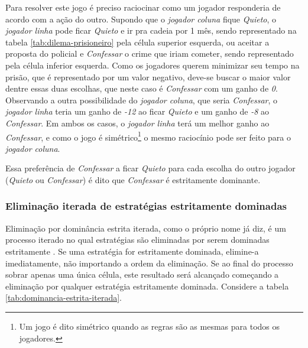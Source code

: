 Para resolver este jogo é preciso raciocinar como um jogador responderia de acordo com a ação do outro. Supondo que o \emph{jogador coluna} fique \emph{Quieto}, o \emph{jogador linha} pode ficar \emph{Quieto} e ir pra cadeia por 1 mês, sendo representado na tabela \ref{tab:dilema-prisioneiro} pela célula superior esquerda, ou aceitar a proposta do policial e \emph{Confessar} o crime que iriam cometer, sendo representado pela célula inferior esquerda. Como os jogadores querem minimizar seu tempo na prisão, que é representado por um valor negativo, deve-se buscar o maior valor dentre essas duas escolhas, que neste caso é \emph{Confessar} com um ganho de \emph{0}. Observando a outra possibilidade do \emph{jogador coluna}, que seria \emph{Confessar}, o \emph{jogador linha} teria um ganho de \emph{-12} ao ficar \emph{Quieto} e um ganho de \emph{-8} ao \emph{Confessar}. Em ambos os casos, o \emph{jogador linha} terá um melhor ganho ao \emph{Confessar}, e como o jogo é simétrico\footnote{Um jogo é dito simétrico quando as regras são as mesmas para todos os jogadores.} o mesmo raciocínio pode ser feito para o \emph{jogador coluna}.

Essa preferência de \emph{Confessar} a ficar \emph{Quieto} para cada escolha do outro jogador (\emph{Quieto} ou \emph{Confessar}) é dito que \emph{Confessar} é estritamente dominante.

\subsubsection{Eliminação iterada de estratégias estritamente dominadas}

Eliminação por dominância estrita iterada, como o próprio nome já diz, é um processo iterado no qual estratégias são eliminadas por serem dominadas estritamente \cite{spaniel_2011}. Se uma estratégia for estritamente dominada, elimine-a imediatamente, não importando a ordem da eliminação. Se ao final do processo sobrar apenas uma única célula, este resultado será alcançado começando a eliminação por qualquer estratégia estritamente dominada. Considere a tabela \ref{tab:dominancia-estrita-iterada}.

